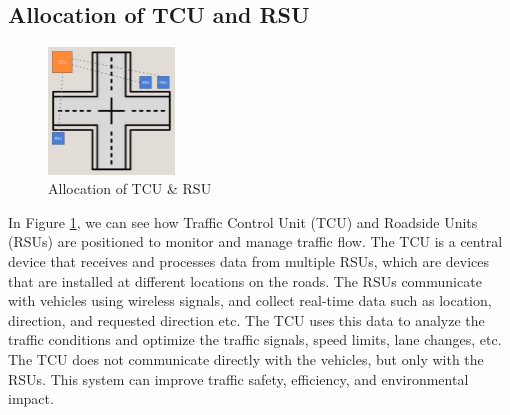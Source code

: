 \subsection{Allocation of TCU and RSU }
\label{subsec:allocation_of_tcu_and_rsu}
\begin{figure}[ht]
    \centering
    \includegraphics[width=0.3\textwidth]{images/tcu_rsu_position.png}
    \caption{Allocation of TCU \& RSU }
    \label{img:tcu_rcu_position}
\end{figure}
In Figure \ref{img:tcu_rcu_position}, we can see how Traffic Control Unit (TCU) and Roadside Units (RSUs) are positioned to monitor and manage traffic flow. The TCU is a central device that receives and processes data from multiple RSUs, which are devices that are installed at different locations on the roads. The RSUs communicate with vehicles using wireless signals, and collect real-time data such as location, direction, and requested direction etc. The TCU uses this data to analyze the traffic conditions and optimize the traffic signals, speed limits, lane changes, etc. The TCU does not communicate directly with the vehicles, but only with the RSUs. This system can improve traffic safety, efficiency, and environmental impact.
